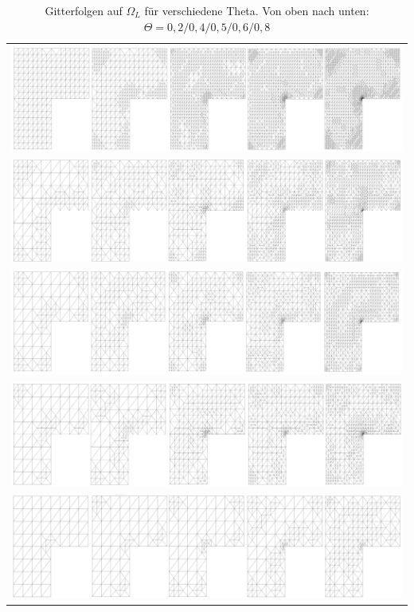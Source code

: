 \begin{table}[!htbp]
	\begin{tabular}{c}
		\includegraphics[width=15.5cm]{pics/grid02.png} \\
		\includegraphics[width=15.5cm]{pics/grid04.png} \\
		\includegraphics[width=15.5cm]{pics/grid05.png} \\
		\includegraphics[width=15.5cm]{pics/grid06.png} \\
		\includegraphics[width=15.5cm]{pics/grid08.png} \\
	\end{tabular}
	\caption{ \label{tabelle} Gitterfolgen auf $\Omega_L$ für verschiedene Theta. Von oben nach unten: \newline $\Theta = 0,2/0,4/0,5/0,6/0,8$}
\end{table}
